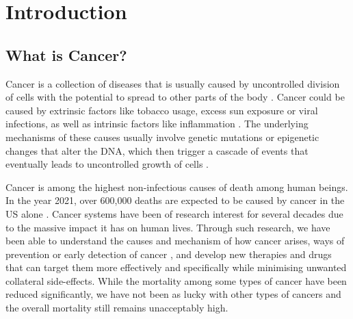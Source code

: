\chapter{Introduction}

\section{What is Cancer?}
Cancer is a collection of diseases that is usually caused by uncontrolled division of cells with the potential to spread to other parts of the body \cite{cancergov}. Cancer could be caused by extrinsic factors like tobacco usage, excess sun exposure or viral infections, as well as intrinsic factors like inflammation \cite{Trichopoulos,Coussens}. The underlying mechanisms of these causes usually involve genetic mutations or epigenetic changes that alter the DNA, which then trigger a cascade of events that eventually leads to uncontrolled growth of cells \cite{Moolgavkar,Gronbaek}.

Cancer is among the highest non-infectious causes of death among human beings. In the year 2021, over 600,000 deaths are expected to be caused by cancer in the US alone \cite{cancer_stats}. Cancer systems have been of research interest for several decades due to the massive impact it has on human lives. Through such research, we have been able to understand the causes and mechanism of how cancer arises, ways of prevention or early detection of cancer \cite{Loeb,Elmore,Goodman}, and develop new therapies and drugs that can target them more effectively and specifically while minimising unwanted collateral side-effects. While the mortality among some types of cancer have been reduced significantly, we have not been as lucky with other types of cancers and the overall mortality still remains unacceptably high.

